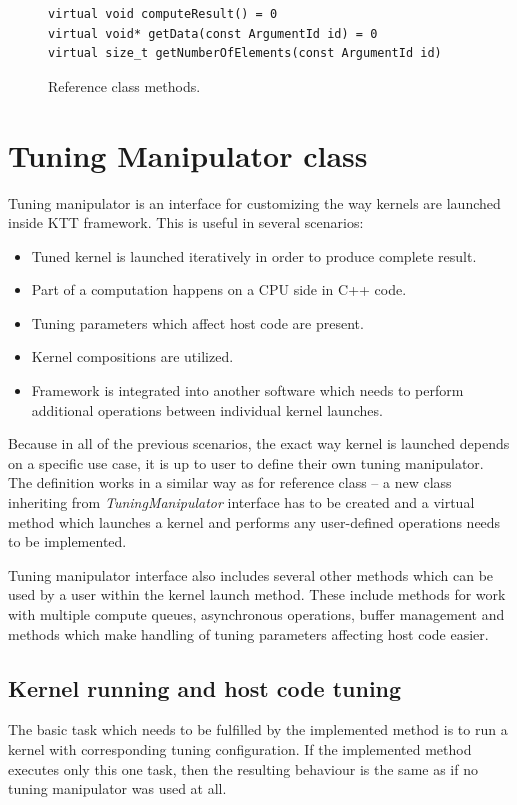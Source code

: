 \documentclass
[
    digital, %
    oneside, %
    table, %
    nolof, %
    nolot, %
    nocover %
]{fithesis3}
\begin{document}
\begin{figure}
\begin{adjustwidth}{-1cm}{-1cm}
\begin{lstlisting}
virtual void computeResult() = 0
virtual void* getData(const ArgumentId id) = 0
virtual size_t getNumberOfElements(const ArgumentId id)
\end{lstlisting}
\caption{Reference class methods.}
\label{ktt-reference-methods}
\end{adjustwidth}
\end{figure}

\section{Tuning Manipulator class}
\label{ktt-manipulator}
Tuning manipulator is an interface for customizing the way kernels are launched inside KTT framework. This is useful in several scenarios:
\begin{itemize}
    \item Tuned kernel is launched iteratively in order to produce complete result.
    \item Part of a computation happens on a CPU side in C++ code.
    \item Tuning parameters which affect host code are present.
    \item Kernel compositions are utilized.
    \item Framework is integrated into another software which needs to perform additional operations between individual kernel launches.
\end{itemize}

Because in all of the previous scenarios, the exact way kernel is launched depends on a specific use case, it is up to user to define their own tuning
manipulator. The definition works in a similar way as for reference class -- a new class inheriting from \textit{TuningManipulator} interface has to be
created and a virtual method which launches a kernel and performs any user-defined operations needs to be implemented.

Tuning manipulator interface also includes several other methods which can be used by a user within the kernel launch method. These include methods
for work with multiple compute queues, asynchronous operations, buffer management and methods which make handling of tuning parameters affecting
host code easier.

\subsection{Kernel running and host code tuning}
The basic task which needs to be fulfilled by the implemented method is to run a kernel with corresponding tuning configuration. If the implemented
method executes only this one task, then the resulting behaviour is the same as if no tuning manipulator was used at all.
\end{document}
